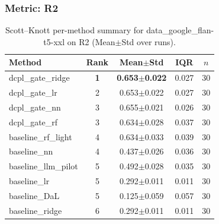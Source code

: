 \subsubsection*{Metric: R2}
\begin{table}[H]
\centering
\scriptsize
\setlength{\tabcolsep}{4pt}
\renewcommand{\arraystretch}{1.1}
\caption{Scott--Knott per-method summary for data\_google\_flan-t5-xxl on R2 (Mean$\pm$Std over runs).}
\label{tab:sk_data_google_flan-t5-xxl_R2}
\begin{tabular}{l|c|c|c|c}
\hline
\textbf{Method} & \textbf{Rank} & \textbf{Mean$\pm$Std} & \textbf{IQR} & \textbf{$n$} \\
\hline
\rowcolor{red!15} dcpl\_gate\_ridge & \textbf{1} & \textbf{0.653$\pm$0.022} & 0.027 & 30 \\
dcpl\_gate\_lr & 2 & 0.653$\pm$0.022 & 0.027 & 30 \\
dcpl\_gate\_nn & 3 & 0.655$\pm$0.021 & 0.026 & 30 \\
dcpl\_gate\_rf & 3 & 0.634$\pm$0.028 & 0.037 & 30 \\
baseline\_rf\_light & 4 & 0.634$\pm$0.033 & 0.039 & 30 \\
baseline\_nn & 4 & 0.437$\pm$0.026 & 0.036 & 30 \\
baseline\_llm\_pilot & 5 & 0.492$\pm$0.028 & 0.035 & 30 \\
baseline\_lr & 5 & 0.292$\pm$0.011 & 0.011 & 30 \\
baseline\_DaL & 5 & 0.125$\pm$0.059 & 0.057 & 30 \\
baseline\_ridge & 6 & 0.292$\pm$0.011 & 0.011 & 30 \\
\hline
\end{tabular}
\end{table}

